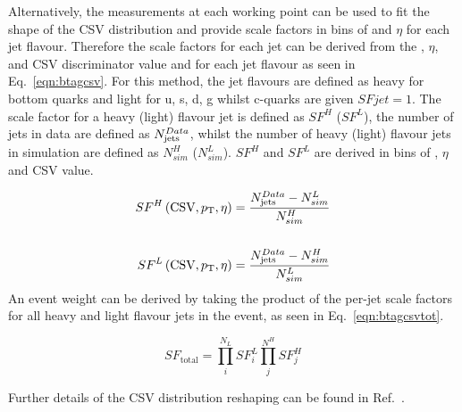 Alternatively, the measurements at each working point can be used to fit the shape of the CSV distribution and provide scale factors in bins of \pt and $\eta$ for each jet flavour. Therefore the scale factors for each jet can be derived from the \pt, $\eta$, and CSV discriminator value and for each jet flavour as seen in Eq.~\ref{eqn:btagcsv}. For this method, the jet flavours are defined as heavy for bottom quarks and light for u, s, d, g whilst c-quarks are given ${SFjet} = 1$. The scale factor for a heavy (light) flavour jet is defined as ${SF}^{H}$ (${SF}^{L}$), the number of jets in data are defined as $N_{\textrm{jets}}^{Data}$, whilst the number of heavy (light) flavour jets in simulation are defined as $N^{H}_{sim}$ ($N^{L}_{sim}$). ${SF}^{H}$ and ${SF}^{L}$ are derived in bins of \pt, $\eta$ and CSV value.

\begin{equation}
\label{eqn:btagcsv}
\begin{split}
{SF}^{H} \left(\textrm{CSV},p_{\mathrm{T}},\eta \right) = \frac{N_{\textrm{jets}}^{Data} - N^{L}_{sim}}{N^{H}_{sim}}\\ \\
{SF}^{L} \left(\textrm{CSV},p_{\mathrm{T}},\eta \right) = \frac{N_{\textrm{jets}}^{Data} - N^{H}_{sim}}{N^{L}_{sim}}
\end{split}
\end{equation}
An event weight can be derived by taking the product of the per-jet scale factors for all heavy and light flavour jets in the event, as seen in Eq.~\ref{eqn:btagcsvtot}.

\begin{equation}
{SF}_{\textrm{total}} = \prod_{i}^{N_{L}}{SF}^{L}_{i}\prod_{j}^{N^{H}}{SF}^{H}_{j}
\label{eqn:btagcsvtot}
\end{equation}

Further details of the CSV distribution reshaping can be found in Ref.~\cite{CMS-NOTE-2013-130}.

